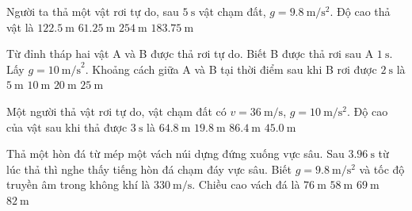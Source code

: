 \begin{ex}
	Người ta thả một vật rơi tự do, sau $\SI{5}{\second}$ vật chạm đất, $g=\SI{9.8}{\meter/\second^2}$. Độ cao thả vật là
	\choice
	{\True $\SI{122.5}{\meter}$}
	{$\SI{61.25}{\meter}$}
	{$\SI{254}{\meter}$}
	{$\SI{183,75}{\meter}$}
\end{ex}

\begin{ex}
	Từ đỉnh tháp hai vật A và B được thả rơi tự do. Biết B được thả rơi sau A $1\ \text{s}$. Lấy $g=10\ \text{m/s}^2$. Khoảng cách giữa A và B tại thời điểm sau khi B rơi được $2\ \text{s}$ là
	\choice
	{$5\ \text{m}$}
	{$10\ \text{m}$}
	{$20\ \text{m}$}
	{\True $25\ \text{m}$}
\end{ex}

\begin{ex}
	Một người thả vật rơi tự do, vật chạm đất có $v=\SI{36}{\meter/\second}$, $g=\SI{10}{\meter/\second^2}$. Độ cao của vật sau khi thả được $\SI{3}{\second}$ là
	\choice
	{$\SI{64.8}{\meter}$}
	{\True $\SI{19.8}{\meter}$}
	{$\SI{86.4}{\meter}$}
	{$\SI{45.0}{\meter}$}
\end{ex}

\begin{ex}
	Thả một hòn đá từ mép một vách núi dựng đứng xuống vực sâu. Sau $\SI{3.96}{\second}$ từ lúc thả thì nghe thấy tiếng hòn đá chạm đáy vực sâu. Biết $g=\SI{9.8}{\meter/\second^2}$ và tốc độ truyền âm trong không khí là $\SI{330}{\meter/\second}$. Chiều cao vách đá là
	\choice
	{$\SI{76}{\meter}$}
	{$\SI{58}{\meter}$}
	{\True $\SI{69}{\meter}$}
	{$\SI{82}{\meter}$}
\end{ex}

